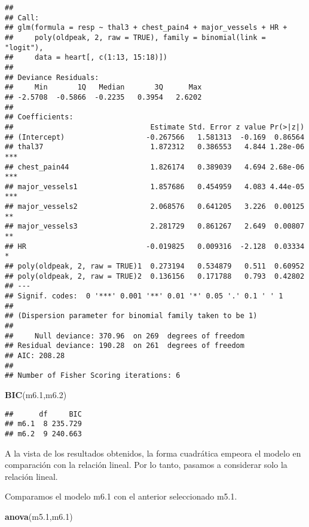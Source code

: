 \documentclass[]{article}
\newenvironment{Shaded}{\begin{snugshade}}{\end{snugshade}}
\newcommand{\KeywordTok}[1]{\textcolor[rgb]{0.13,0.29,0.53}{\textbf{#1}}}
\newcommand{\DecValTok}[1]{\textcolor[rgb]{0.00,0.00,0.81}{#1}}
\newcommand{\NormalTok}[1]{#1}
\begin{document}
\begin{verbatim}
## 
## Call:
## glm(formula = resp ~ thal3 + chest_pain4 + major_vessels + HR + 
##     poly(oldpeak, 2, raw = TRUE), family = binomial(link = "logit"), 
##     data = heart[, c(1:13, 15:18)])
## 
## Deviance Residuals: 
##     Min       1Q   Median       3Q      Max  
## -2.5708  -0.5866  -0.2235   0.3954   2.6202  
## 
## Coefficients:
##                                Estimate Std. Error z value Pr(>|z|)    
## (Intercept)                   -0.267566   1.581313  -0.169  0.86564    
## thal37                         1.872312   0.386553   4.844 1.28e-06 ***
## chest_pain44                   1.826174   0.389039   4.694 2.68e-06 ***
## major_vessels1                 1.857686   0.454959   4.083 4.44e-05 ***
## major_vessels2                 2.068576   0.641205   3.226  0.00125 ** 
## major_vessels3                 2.281729   0.861267   2.649  0.00807 ** 
## HR                            -0.019825   0.009316  -2.128  0.03334 *  
## poly(oldpeak, 2, raw = TRUE)1  0.273194   0.534879   0.511  0.60952    
## poly(oldpeak, 2, raw = TRUE)2  0.136156   0.171788   0.793  0.42802    
## ---
## Signif. codes:  0 '***' 0.001 '**' 0.01 '*' 0.05 '.' 0.1 ' ' 1
## 
## (Dispersion parameter for binomial family taken to be 1)
## 
##     Null deviance: 370.96  on 269  degrees of freedom
## Residual deviance: 190.28  on 261  degrees of freedom
## AIC: 208.28
## 
## Number of Fisher Scoring iterations: 6
\end{verbatim}

\begin{Shaded}
\begin{Highlighting}[]
\KeywordTok{BIC}\NormalTok{(m6.}\DecValTok{1}\NormalTok{,m6.}\DecValTok{2}\NormalTok{)}
\end{Highlighting}
\end{Shaded}

\begin{verbatim}
##      df     BIC
## m6.1  8 235.729
## m6.2  9 240.663
\end{verbatim}

A la vista de los resultados obtenidos, la forma cuadrática empeora el
modelo en comparación con la relación lineal. Por lo tanto, pasamos a
considerar solo la relación lineal.

Comparamos el modelo m6.1 con el anterior seleccionado m5.1.

\begin{Shaded}
\begin{Highlighting}[]
\KeywordTok{anova}\NormalTok{(m5.}\DecValTok{1}\NormalTok{,m6.}\DecValTok{1}\NormalTok{)}
\end{Highlighting}
\end{Shaded}
\end{document}
